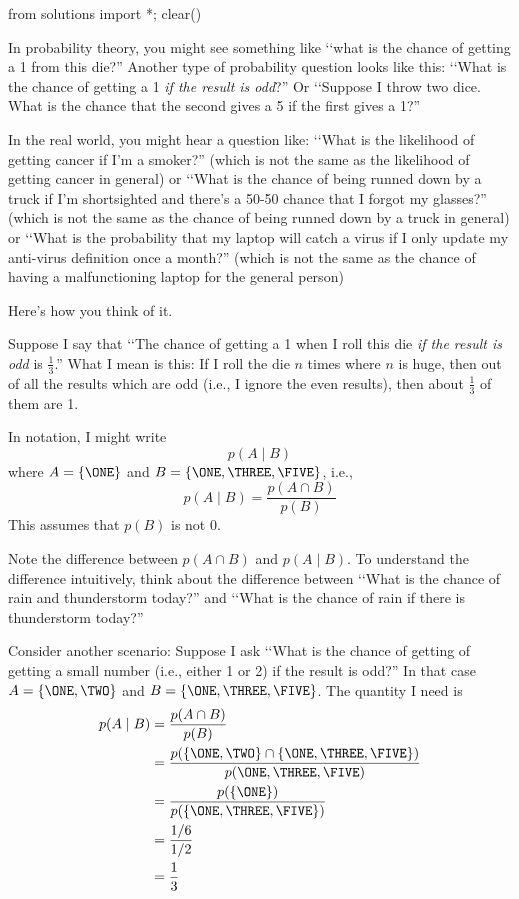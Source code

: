 \begin{python0}
from solutions import *; clear()
\end{python0}

In probability theory, you might see something like 
\lq\lq what is the chance of getting a 1 from this die?''
Another type of probability question looks like this:
\lq\lq What is the chance of getting a 1
\textit{if the result is odd}?''
Or 
\lq\lq Suppose I throw two dice. What is the chance that the second
gives a 5 if the first gives a 1?''

In the real world, you might hear a question like:
\lq\lq What is the likelihood of getting cancer if I'm a smoker?''
(which is not the same as the likelihood of getting cancer in general)
or 
\lq\lq What is the chance of being runned down by a truck if I'm shortsighted
and there's a 50-50 chance that I forgot my glasses?'' 
(which is not the same as the chance of being runned down by a truck in 
general)
or 
\lq\lq What is the probability that my laptop will catch a virus if I only 
update my anti-virus definition once a month?''
(which is not the same as the chance of having a malfunctioning laptop 
for the general person)


Here's how you think of it.

Suppose I say that 
\lq\lq The chance of getting a 1 when I roll this die
\textit{if the result is odd} is $\frac{1}{3}$.''
What I mean is this:
If I roll the die $n$ times where $n$ is huge, then out of all
the results which are odd (i.e., I ignore the even results),
then about $\frac{1}{3}$ of them are 1. 

In notation, I might write
\[
p(A \mid B)
\]
where $A = \{ \ONE \}$ and $B = \{ \ONE, \THREE, \FIVE \}$, i.e.,
\[
p(A \mid B) = \frac{p(A \cap B)}{p(B)}
\]
This assumes that $p(B)$ is not 0.

Note the difference between $p(A \cap B)$ and $p(A \mid B)$.
To understand the difference intuitively, think about the 
difference between \lq\lq What is the chance of rain and thunderstorm today?''
and \lq\lq What is the chance of rain if there is thunderstorm today?''


  
Consider another scenario:
Suppose I ask \lq\lq What is the chance of getting of getting a small
number (i.e., either 1 or 2) if the result is odd?''
In that case $A = \{\ONE, \TWO\}$ and
$B = \{\ONE, \THREE, \FIVE\}$.
The quantity I need is
\begin{align*}
p(A \mid B)
&= \frac{p(A \cap B)}{p(B)} \\
&= \frac{p( \{ \ONE, \TWO \} \cap \{\ONE, \THREE, \FIVE \})}{p(\ONE, \THREE, \FIVE)}
\\
&= \frac{p( \{ \ONE \} ) }{p( \{ \ONE, \THREE, \FIVE\}) }
\\
&= \frac{ 1/6 }{ 1/2 }
\\
&= \frac{1}{3}
\end{align*}

